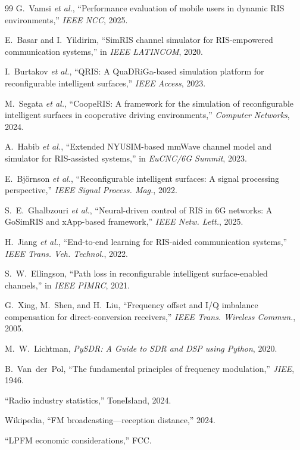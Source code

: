 \documentclass{article}
\begin{document}
{\begin{thebibliography}{99}
G.~Vamsi \emph{et al.}, ``Performance evaluation of mobile users in dynamic RIS environments,'' \emph{IEEE NCC}, 2025.

E.~Basar and I.~Yildirim, ``SimRIS channel simulator for RIS-empowered communication systems,'' in \emph{IEEE LATINCOM}, 2020.

I.~Burtakov \emph{et al.}, ``QRIS: A QuaDRiGa-based simulation platform for reconfigurable intelligent surfaces,'' \emph{IEEE Access}, 2023.

M.~Segata \emph{et al.}, ``CoopeRIS: A framework for the simulation of reconfigurable intelligent surfaces in cooperative driving environments,'' \emph{Computer Networks}, 2024.

A.~Habib \emph{et al.}, ``Extended NYUSIM-based mmWave channel model and simulator for RIS-assisted systems,'' in \emph{EuCNC/6G Summit}, 2023.

E.~Bj\"{o}rnson \emph{et al.}, ``Reconfigurable intelligent surfaces: A signal processing perspective,'' \emph{IEEE Signal Process. Mag.}, 2022.

S.~E.~Ghalbzouri \emph{et al.}, ``Neural-driven control of RIS in 6G networks: A GoSimRIS and xApp-based framework,'' \emph{IEEE Netw. Lett.}, 2025.

H.~Jiang \emph{et al.}, ``End-to-end learning for RIS-aided communication systems,'' \emph{IEEE Trans. Veh. Technol.}, 2022.

S.~W.~Ellingson, ``Path loss in reconfigurable intelligent surface-enabled channels,'' in \emph{IEEE PIMRC}, 2021.

G.~Xing, M.~Shen, and H.~Liu, ``Frequency offset and I/Q imbalance compensation for direct-conversion receivers,'' \emph{IEEE Trans. Wireless Commun.}, 2005.

M.~W.~Lichtman, \emph{PySDR: A Guide to SDR and DSP using Python}, 2020.

B.~Van~der~Pol, ``The fundamental principles of frequency modulation,'' \emph{JIEE}, 1946.

``Radio industry statistics,'' ToneIsland, 2024.

Wikipedia, ``FM broadcasting---reception distance,'' 2024.

``LPFM economic considerations,'' FCC.


\end{thebibliography}}
\end{document}
